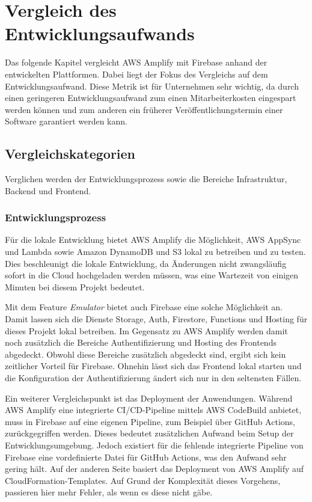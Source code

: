 \chapter{Vergleich des Entwicklungsaufwands}
\label{kap6}

Das folgende Kapitel vergleicht \ac{AWS} Amplify mit Firebase anhand der entwickelten Plattformen. Dabei liegt der Fokus des Vergleichs auf dem Entwicklungsaufwand. Diese Metrik ist für Unternehmen sehr wichtig, da durch einen geringeren Entwicklungsaufwand zum einen Mitarbeiterkosten eingespart werden können und zum anderen ein früherer Veröffentlichungstermin einer Software garantiert werden kann.

\section{Vergleichskategorien}

Verglichen werden der Entwicklungsprozess sowie die Bereiche Infrastruktur, Backend und Frontend.

\subsection{Entwicklungsprozess}

Für die lokale Entwicklung bietet \ac{AWS} Amplify die Möglichkeit, \ac{AWS} AppSync und Lambda sowie Amazon DynamoDB und S3 lokal zu betreiben und zu testen. Dies beschleunigt die lokale Entwicklung, da Änderungen nicht zwangsläufig sofort in die Cloud hochgeladen werden müssen, was eine Wartezeit von einigen Minuten bei diesem Projekt bedeutet.

Mit dem Feature \textit{Emulator} bietet auch Firebase eine solche Möglichkeit an. Damit lassen sich die Dienste Storage, Auth, Firestore, Functions und Hosting für dieses Projekt lokal betreiben. Im Gegensatz zu \ac{AWS} Amplify werden damit noch zusätzlich die Bereiche Authentifizierung und Hosting des Frontends abgedeckt. Obwohl diese Bereiche zusätzlich abgedeckt sind, ergibt sich kein zeitlicher Vorteil für Firebase. Ohnehin lässt sich das Frontend lokal starten und die Konfiguration der Authentifizierung ändert sich nur in den seltensten Fällen.

Ein weiterer Vergleichspunkt ist das Deployment der Anwendungen. Während \ac{AWS} Amplify eine integrierte CI/CD-Pipeline mittels \ac{AWS} CodeBuild anbietet, muss in Firebase auf eine eigenen Pipeline, zum Beispiel über GitHub Actions, zurückgegriffen werden. Dieses bedeutet zusätzlichen Aufwand beim Setup der Entwicklungsumgebung. Jedoch existiert für die fehlende integrierte Pipeline von Firebase eine vordefinierte Datei für GitHub Actions, was den Aufwand sehr gering hält. Auf der anderen Seite basiert das Deployment von \ac{AWS} Amplify auf CloudFormation-Templates. Auf Grund der Komplexität dieses Vorgehens, passieren hier mehr Fehler, als wenn es diese nicht gäbe.

